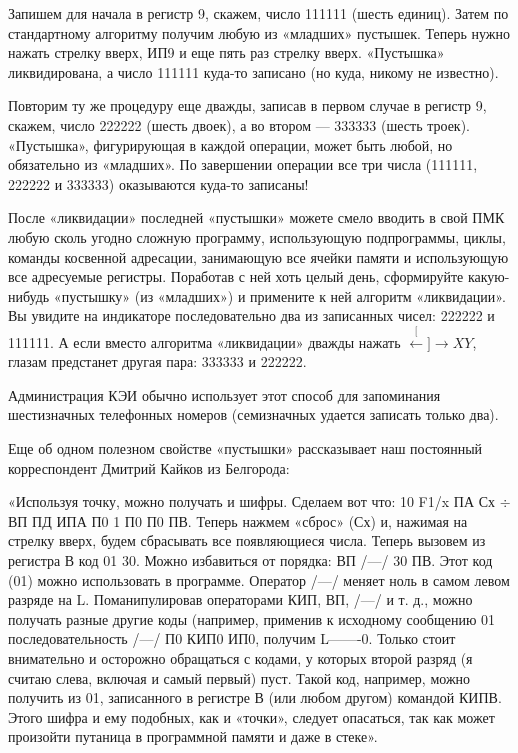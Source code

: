 \documentclass[11pt,a4paper,oneside]{article}
\def\XY{$\stackrel[\leftarrow]{\rightarrow}{XY}$}
\begin{document}
Запишем для начала в регистр 9, скажем, число 111111 (шесть единиц). Затем по стандартному алгоритму получим любую из «младших» пустышек. Теперь нужно нажать стрелку вверх, ИП9 и еще пять раз стрелку вверх. «Пустышка» ликвидирована, а число 111111 куда-то записано (но куда, никому не известно).

Повторим ту же процедуру еще дважды, записав в первом случае в регистр 9, скажем, число 222222 (шесть двоек), а во втором — 333333 (шесть троек). «Пустышка», фигурирующая в каждой операции, может быть любой, но обязательно из «младших». По завершении операции все три числа (111111, 222222 и 333333) оказываются куда-то записаны!

После «ликвидации» последней «пустышки» можете смело вводить в свой ПМК любую сколь угодно сложную программу, использующую подпрограммы, циклы, команды косвенной адресации, занимающую все ячейки памяти и использующую все адресуемые регистры. Поработав с ней хоть целый день, сформируйте какую-нибудь «пустышку» (из «младших») и примените к ней алгоритм «ликвидации». Вы увидите на индикаторе последовательно два из записанных чисел: 222222 и 111111. А если вместо алгоритма «ликвидации» дважды нажать \XY, глазам предстанет другая пара: 333333 и 222222.

Администрация КЭИ обычно использует этот способ для запоминания шестизначных телефонных номеров (семизначных удается записать только два).

Еще об одном полезном свойстве «пустышки» рассказывает наш постоянный корреспондент Дмитрий Кайков из Белгорода:

«Используя точку, можно получать и шифры. Сделаем вот что: 10 F1/x ПА Сх $\div$ ВП ПД ИПА П0 1 П0 П0 ПВ. Теперь нажмем «сброс» (Сх) и, нажимая на стрелку вверх, будем сбрасывать все появляющиеся числа. Теперь вызовем из регистра В код 01 30. Можно избавиться от порядка: ВП /—/ 30 ПВ. Этот код (01) можно использовать в программе. Оператор /—/ меняет ноль в самом левом разряде на L. Поманипулировав операторами КИП, ВП, /—/ и т. д., можно получать разные другие коды (например, применив к исходному сообщению 01 последовательность /—/ П0 КИП0 ИП0, получим L-------0. Только стоит внимательно и осторожно обращаться с кодами, у которых второй разряд (я считаю слева, включая и самый первый) пуст. Такой код, например, можно получить из 01, записанного в регистре В (или любом другом) командой КИПВ. Этого шифра и ему подобных, как и «точки», следует опасаться, так как может произойти путаница в программной памяти и даже в стеке».
\end{document}
